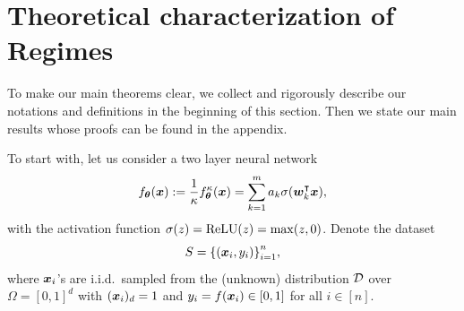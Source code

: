 \documentclass{article}
\begin{document}
\section{Theoretical characterization of Regimes}
To make our main theorems clear, we collect and rigorously describe our notations and definitions in the beginning of this section. Then we state our main results whose proofs can be found in the appendix.

To start with, let us consider a two layer neural network
\begin{equation}
    f_{\bm{\theta}}(\bm{x}) := \frac{1}{\kappa}f^\kappa_{\bm{\theta}}(\bm{x}) = \sum_{k=1}^{m} a_k\sigma(\bm{w}_k^\intercal\bm{x}),
\end{equation}
with the activation function $\sigma(z) = \mathrm{ReLU}(z) = \max(z, 0)$. Denote the dataset
\begin{equation}
    S = {\{(\bm{x}_i, y_i)\}}_{i=1}^n,
\end{equation}
where $\bm{x}_i$'s are i.i.d.\ sampled from the (unknown) distribution $\mathcal{D}$ over $\Omega={[0,1]}^d$ with $(\bm{x}_i)_d=1$ and $y_i=f(\bm{x}_i)\in[0,1]$ for all $i\in[n]$.
\end{document}
